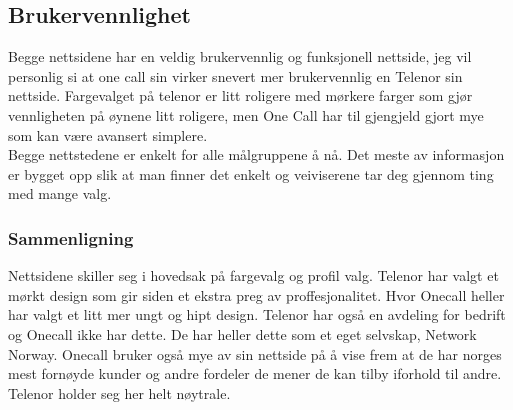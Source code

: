 \documentclass[a4paper, 10pt]{article}
\begin{document}
\subsection*{Brukervennlighet}
Begge nettsidene har en veldig brukervennlig og funksjonell nettside, jeg vil personlig si at one call sin virker snevert mer brukervennlig en Telenor sin nettside. Fargevalget på telenor er litt roligere med mørkere farger som gjør vennligheten på øynene litt roligere, men One Call har til gjengjeld gjort mye som kan være avansert simplere.\\

Begge nettstedene er enkelt for alle målgruppene å nå. Det meste av informasjon er bygget opp slik at man finner det enkelt og veiviserene tar deg gjennom ting med mange valg.




\subsubsection*{Sammenligning}
Nettsidene skiller seg i hovedsak på fargevalg og profil valg. Telenor har valgt et mørkt design som gir siden et ekstra preg av proffesjonalitet. Hvor Onecall heller har valgt et litt mer ungt og hipt design. Telenor har også en avdeling for bedrift og Onecall ikke har dette. De har heller dette som et eget selvskap, Network Norway. Onecall bruker også mye  av sin nettside på å vise frem at de har norges mest fornøyde kunder og andre fordeler de mener de kan tilby iforhold til andre. Telenor holder seg her helt nøytrale.
\end{document}
